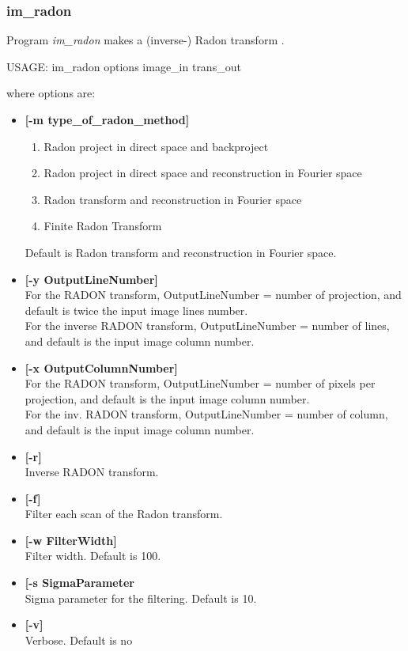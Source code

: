 \documentclass[11pt,a4paper]{article}
\begin{document}
\subsubsection{im\_radon}
Program {\em im\_radon} makes a (inverse-) Radon transform .
\begin{center}
 USAGE:  im\_radon  options image\_in trans\_out
\end{center}
where options are:
\begin{itemize}
\item {\bf [-m type\_of\_radon\_method]} \\
\begin{enumerate}
\item  Radon project in direct space and backproject
\item  Radon project in direct space and reconstruction in Fourier space
\item  Radon transform and reconstruction in Fourier space
\item  Finite Radon Transform
\end{enumerate}
Default is Radon transform and reconstruction in Fourier space.

\item {\bf [-y OutputLineNumber]} \\
For the RADON transform, OutputLineNumber = number of projection,
 and default is twice the input image lines number. \\
For the inverse RADON transform, OutputLineNumber = number of lines,
and default is the input image column number.

\item {\bf [-x OutputColumnNumber]} \\
For the RADON transform, OutputLineNumber = number of pixels per projection,
and default is the input image column number. \\
For the inv. RADON transform, OutputLineNumber = number of column,
and default is the input image column number.

\item {\bf [-r]} \\
Inverse RADON transform.

\item {\bf [-f]} \\
Filter each scan of the Radon transform. 

\item {\bf [-w FilterWidth]} \\
Filter width. Default is 100. 

\item {\bf [-s SigmaParameter} \\
 Sigma parameter for the filtering. Default is 10.

\item {\bf [-v]} \\
Verbose. Default is no
\end{itemize}
\end{document}
